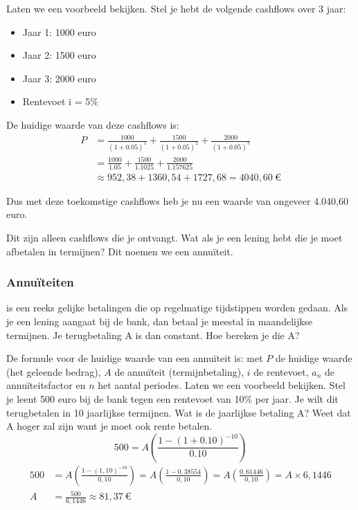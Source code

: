 \documentclass[a4paper,11pt]{article}
\begin{document}
Laten we een voorbeeld bekijken.
Stel je hebt de volgende cashflows over 3 jaar:
\begin{itemize}
    \item Jaar 1: 1000 euro
    \item Jaar 2: 1500 euro
    \item Jaar 3: 2000 euro
    \item Rentevoet i = 5\%
\end{itemize}
De huidige waarde van deze cashflows is:
\[
    \begin{aligned}
        P & = \frac{1000}{(1 + 0.05)^1} + \frac{1500}{(1 + 0.05)^2} + \frac{2000}{(1 + 0.05)^3} \\
          & = \frac{1000}{1.05} + \frac{1500}{1.1025} + \frac{2000}{1.157625}                   \\
          & \approx 952{,}38 + 1360{,}54 + 1727{,}68 = 4040{,}60~\text{€}
    \end{aligned}
\]

Dus met deze toekomstige cashflows heb je nu een waarde van ongeveer 4.040,60 euro.
\newline

Dit zijn alleen cashflows die je ontvangt. Wat als je een lening hebt die je moet afbetalen in termijnen?
Dit noemen we een annuïteit.
\newline
\subsubsection{Annuïteiten}
 is een reeks gelijke betalingen die op regelmatige tijdstippen worden gedaan.
Als je een lening aangaat bij de bank, dan betaal je meestal in maandelijkse termijnen.
Je terugbetaling A is dan constant. Hoe bereken je die A?
\newline

De formule voor de huidige waarde van een annuïteit is:
{met $P$ de huidige waarde (het geleende bedrag), $A$ de annuïteit (termijnbetaling), $i$ de rentevoet,
    $a_n$ de annuïteitsfactor en $n$ het aantal periodes.}
Laten we een voorbeeld bekijken.
Stel je leent 500 euro bij de bank tegen een rentevoet van 10\% per jaar.
Je wilt dit terugbetalen in 10 jaarlijkse termijnen. Wat is de jaarlijkse betaling A?
Weet dat A hoger zal zijn want je moet ook rente betalen.
\[
    500 = A \left( \frac{1 - (1 + 0.10)^{-10}}{0.10} \right)
\]
\[
    \begin{aligned}
        500 & = A \left( \frac{1 - (1{,}10)^{-10}}{0{,}10} \right)
        = A \left( \frac{1 - 0{,}38554}{0{,}10} \right)
        = A \left( \frac{0{,}61446}{0{,}10} \right) = A \times 6{,}1446 \\[4pt]
        A   & = \frac{500}{6{,}1446} \approx 81{,}37~\text{€}
    \end{aligned}
\]
\end{document}
